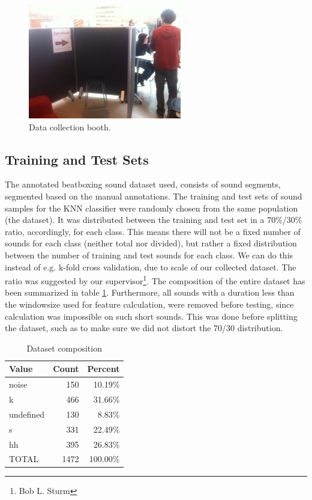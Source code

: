 	\begin{figure}[h]
		\begin{center}
			\includegraphics[height=5cm]{tex/dataset_collection.JPG}
			\caption{Data collection booth.}
			\label{data-collection-pic}
		\end{center}
	\end{figure}
	
	
	\subsection{Training and Test Sets}
		The annotated beatboxing sound dataset used, consists of sound segments, segmented based on the manual annotations. The training and test sets of sound samples for the KNN classifier were randomly chosen from the same population (the dataset). It was distributed between the training and test set in a 70\%/30\% ratio, accordingly, for each class. This means there will not be a fixed number of sounds for each class (neither total nor divided), but rather a fixed distribution between the number of training and test sounds for each class. We can do this instead of e.g. k-fold cross validation, due to scale of our collected dataset. The ratio was suggested by our supervisor\footnote{Bob L. Sturm}. The composition of the entire dataset has been summarized in table \ref{table:eval:datasetComposition}. 
		Furthermore, all sounds with a duration less than the windowsize used for feature calculation, were removed before testing, since calculation was impossible on such short sounds. This was done before splitting the dataset, such as to make sure we did not distort the 70/30 distribution.

		\begin{table}
			\centering
			\begin{tabular}{|l|r|r|}
					\hline
					Value  &  Count  & Percent \\ \hline
			      noise    &  150    & 10.19\% \\ \hline
			          k    &  466    & 31.66\% \\ \hline
			  undefined    &  130    &  8.83\% \\ \hline
			          s    &  331    & 22.49\% \\ \hline
			         hh    &  395    & 26.83\% \\ \hline
			      TOTAL    &  1472	 & 100.00\% \\ \hline

			\end{tabular}
			\caption{Dataset composition}
			\label{table:eval:datasetComposition}
		\end{table}	
			

